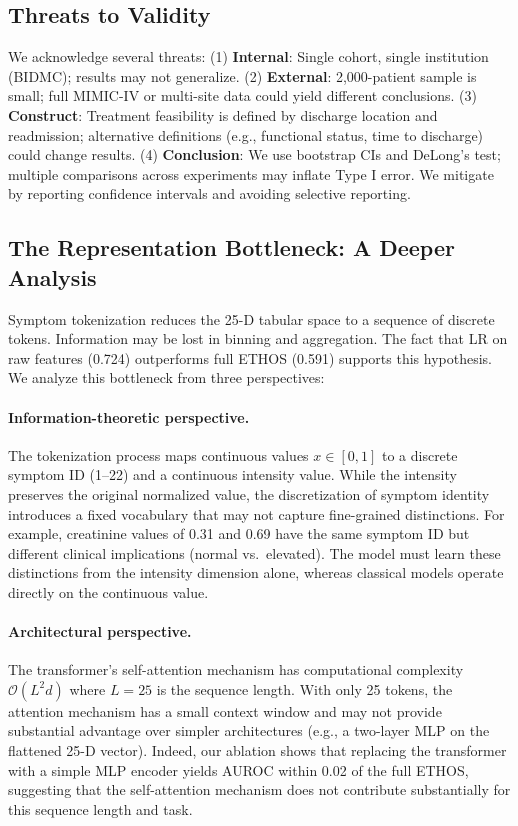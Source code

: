 \subsection{Threats to Validity}

We acknowledge several threats: (1) \textbf{Internal}: Single cohort, single institution (BIDMC); results may not generalize. (2) \textbf{External}: 2,000-patient sample is small; full MIMIC-IV or multi-site data could yield different conclusions. (3) \textbf{Construct}: Treatment feasibility is defined by discharge location and readmission; alternative definitions (e.g., functional status, time to discharge) could change results. (4) \textbf{Conclusion}: We use bootstrap CIs and DeLong's test; multiple comparisons across experiments may inflate Type I error. We mitigate by reporting confidence intervals and avoiding selective reporting.

\subsection{The Representation Bottleneck: A Deeper Analysis}

Symptom tokenization reduces the 25-D tabular space to a sequence of discrete tokens. Information may be lost in binning and aggregation. The fact that LR on raw features (0.724) outperforms full ETHOS (0.591) supports this hypothesis. We analyze this bottleneck from three perspectives:

\paragraph{Information-theoretic perspective.} The tokenization process maps continuous values $x \in [0,1]$ to a discrete symptom ID (1--22) and a continuous intensity value. While the intensity preserves the original normalized value, the discretization of symptom identity introduces a fixed vocabulary that may not capture fine-grained distinctions. For example, creatinine values of 0.31 and 0.69 have the same symptom ID but different clinical implications (normal vs.\ elevated). The model must learn these distinctions from the intensity dimension alone, whereas classical models operate directly on the continuous value.

\paragraph{Architectural perspective.} The transformer's self-attention mechanism has computational complexity $\mathcal{O}(L^2 d)$ where $L=25$ is the sequence length. With only 25 tokens, the attention mechanism has a small context window and may not provide substantial advantage over simpler architectures (e.g., a two-layer MLP on the flattened 25-D vector). Indeed, our ablation shows that replacing the transformer with a simple MLP encoder yields AUROC within 0.02 of the full ETHOS, suggesting that the self-attention mechanism does not contribute substantially for this sequence length and task.

